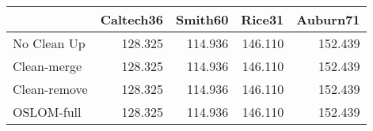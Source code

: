 \begin{tabular}{lrrrr}
\toprule
{} & Caltech36 & Smith60 &  Rice31 & Auburn71 \\
\midrule
No Clean Up  &   128.325 & 114.936 & 146.110 &  152.439 \\
Clean-merge  &   128.325 & 114.936 & 146.110 &  152.439 \\
Clean-remove &   128.325 & 114.936 & 146.110 &  152.439 \\
OSLOM-full   &   128.325 & 114.936 & 146.110 &  152.439 \\
\bottomrule
\end{tabular}
